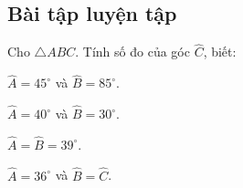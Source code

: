 \subsection{Bài tập luyện tập}
\begin{bt}%
	Cho $\triangle ABC$. Tính số đo của góc $\widehat{C}$, biết:
	\begin{enumEX}{2}
		\item $\widehat{A}=45^\circ$ và $\widehat{B}=85^\circ$.
		\item $\widehat{A}=40^\circ$ và $\widehat{B}=30^\circ$.
		\item $\widehat{A}=\widehat{B}=39^\circ$.
		\item $\widehat{A}=36^\circ$ và $\widehat{B}=\widehat{C}$.
	\end{enumEX}
\end{bt}
